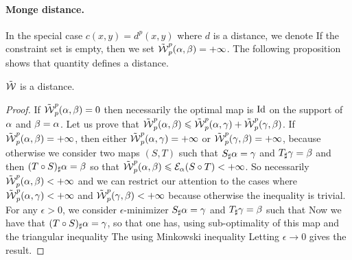 \paragraph{Monge distance.}

In the special case $c(x,y)=d^p(x,y)$ where $d$ is a distance, we denote 
If the constraint set is empty, then we set $\tilde {\operatorname{\mathcal{W}}}_p^p(\alpha,\beta) = +\infty$.
%
The following proposition shows that quantity defines a distance.

\begin{prop}
	$\tilde {\operatorname{\mathcal{W}}}$ is a distance.
\end{prop}
\begin{proof}
	If $\tilde {\operatorname{\mathcal{W}}}_p^p(\alpha,\beta)=0$ then necessarily the optimal map is $\mathrm{Id}$ on the support of $\alpha$ and $\beta=\alpha$.
	Let us prove that $\tilde {\operatorname{\mathcal{W}}}_p^p(\alpha,\beta) \leqslant \tilde {\operatorname{\mathcal{W}}}_p^p(\alpha,\gamma)+\tilde {\operatorname{\mathcal{W}}}_p^p(\gamma,\beta)$.
	If $\tilde {\operatorname{\mathcal{W}}}_p^p(\alpha,\beta)=+\infty$, then either $\tilde {\operatorname{\mathcal{W}}}_p^p(\alpha,\gamma)=+\infty$ or $\tilde {\operatorname{\mathcal{W}}}_p^p(\gamma,\beta)=+\infty$, because otherwise we consider two maps $(S,T)$ such that $S_\sharp \alpha=\gamma$ and $T_\sharp \gamma=\beta$ and then $(T \circ S)_\sharp \alpha = \beta$ so that 
	$\tilde {\operatorname{\mathcal{W}}}_p^p(\alpha,\beta) \leqslant \mathcal{E}_\alpha(S \circ T) < +\infty$.
	So necessarily $\tilde {\operatorname{\mathcal{W}}}_p^p(\alpha,\beta)<+\infty$ and we can restrict our attention to the cases 
	where $\tilde {\operatorname{\mathcal{W}}}_p^p(\alpha,\gamma)<+\infty$ and $\tilde {\operatorname{\mathcal{W}}}_p^p(\gamma,\beta)<+\infty$ because otherwise the inequality is trivial.
	For any $\epsilon>0$, we consider $\epsilon$-minimizer $S_\sharp \alpha=\gamma$ and $T_\sharp \gamma=\beta$ such that
	Now we have that $(T \circ S)_\sharp \alpha=\gamma$, so that 
	one has, using sub-optimality of this map and the triangular inequality 
	The using Minkowski inequality
	Letting $\epsilon \rightarrow 0$ gives the result. 
\end{proof}

